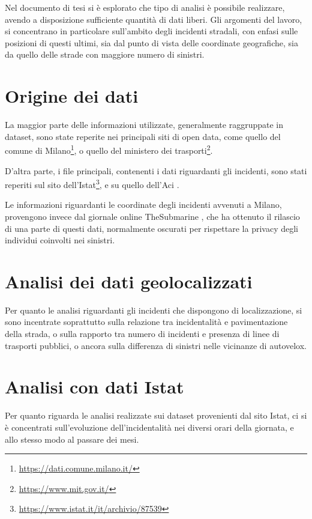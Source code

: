 \documentclass[a4paper,12pt]{article}
\begin{document}
Nel documento di tesi si è esplorato che tipo di analisi è possibile realizzare, 
avendo a disposizione sufficiente quantità di dati liberi. 
Gli argomenti del lavoro, si concentrano in particolare sull'ambito degli incidenti stradali, 
con enfasi sulle posizioni di questi ultimi, sia dal punto di vista delle coordinate 
geografiche, sia da quello delle strade con maggiore numero di sinistri. 

\section{Origine dei dati}

La maggior parte delle informazioni utilizzate, generalmente raggruppate in dataset, sono 
state reperite nei principali siti di open data, come quello del comune di 
Milano\footnote{\url{https://dati.comune.milano.it/}}, o 
quello del ministero dei trasporti\footnote{\url{https://www.mit.gov.it/}}.

D'altra parte, i file principali, contenenti i dati riguardanti gli incidenti, sono 
stati reperiti sul sito 
dell'Istat\footnote{\url{https://www.istat.it/it/archivio/87539}}, e su quello 
dell'Aci \cite{ACI:1}.

Le informazioni riguardanti le coordinate degli incidenti avvenuti a Milano, provengono invece 
dal giornale online TheSubmarine \cite{SUBMARINE:1}, 
che ha ottenuto il rilascio di una parte di questi dati, 
normalmente oscurati per rispettare la privacy degli individui coinvolti nei sinistri.

\section{Analisi dei dati geolocalizzati}

Per quanto le analisi riguardanti gli incidenti che dispongono di localizzazione, 
si sono incentrate soprattutto sulla relazione tra incidentalità e pavimentazione della strada, 
o sulla rapporto tra numero di incidenti e presenza di linee di trasporti pubblici, 
o ancora sulla differenza di sinistri nelle vicinanze di autovelox. 

\section{Analisi con dati Istat}

Per quanto riguarda le analisi realizzate sui dataset provenienti dal sito Istat, 
ci si è concentrati sull'evoluzione dell'incidentalità nei diversi orari della giornata, 
e allo stesso modo al passare dei mesi. 
\end{document}
